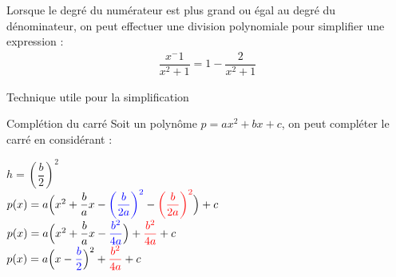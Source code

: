 \documentclass[2pt]{report}
\begin{document}
\begin{multicols*}{3}
\begin{note}{}{}
    Lorsque le degré du numérateur est plus grand ou égal au degré du dénominateur, on peut effectuer une division 
    polynomiale pour simplifier une expression : 
    \begin{align*}
      \dfrac{x^-1}{x^2 +1} = 1 - \dfrac{2}{x^2 +1}
    \end{align*}
\end{note}

Technique utile pour la simplification


\begin{Concept}{Complétion du carré}{}
  Soit un polynôme $p = ax^2 + bx + c$, on peut compléter le carré en considérant : 
  \begin{center}
  $h = \left(\dfrac{b}{2}\right)^2$ \\ 
  $p(x) = a\Bigl(x^2 + \dfrac{b}{a}x - \textcolor{blue}{\left(\dfrac{b}{2a}\right)^2} 
  - \textcolor{red}{\left(\dfrac{b}{2a}\right)^2}\Bigr)  + c  $ \\
  $p(x) = a\Bigl(x^2 + \dfrac{b}{a} x - \textcolor{blue}{\dfrac{b^2}{4a}}\Bigr) + \textcolor{red}{\dfrac{b^2}{4a}}  + c  $ \\ 
  $p(x) = a\Bigl(x - \textcolor{blue}{\dfrac{b}{2}}\Bigr)^2 +  
  \textcolor{red}{\dfrac{b^2}{4a}}  + c  $

  \end{center}
  
\end{Concept}

\end{multicols*}
\end{document}
